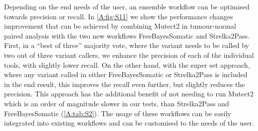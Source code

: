 Depending on the end needs of the user, an ensemble workflow can be optimised towards precision or recall. In \autoref{A:fig:S11} we show the performance changes improvement that can be achieved by combining Mutect2 in tumour-normal paired analysis with the two new workflows FreeBayesSomatic and Strelka2Pass. First, in a “best of three” majority vote, where the variant needs to be called by two out of three variant callers, we enhance the precision of each of the individual tools, with slightly lower recall.
On the other hand, with the super set approach, where any variant called in either FreeBayesSomatic or Strelka2Pass is included in the end result, this improves the recall even further, but slightly reduces the precision. This approach has the additional benefit of not needing to run Mutect2 which is an order of magnitude slower in our tests, than Strelka2Pass and FreeBayesSomatic (\autoref{A:tab:S2}).
The usage of these workflows can be easily integrated into existing workflows and  can be customised to the needs of the user.



\fancyhead[RO]{\rightmark}